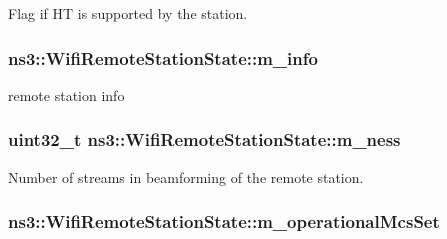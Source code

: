Flag if HT is supported by the station. 

\subsubsection[{\texorpdfstring{m\+\_\+info}{m_info}}]{ ns3\+::\+Wifi\+Remote\+Station\+State\+::m\+\_\+info}\hypertarget{structns3_1_1WifiRemoteStationState_ad094b9d6012f9e03d3b10ff382d5c0eb}{}\label{structns3_1_1WifiRemoteStationState_ad094b9d6012f9e03d3b10ff382d5c0eb}


remote station info 

\subsubsection[{\texorpdfstring{m\+\_\+ness}{m_ness}}]{\setlength{\rightskip}{0pt plus 5cm}uint32\+\_\+t ns3\+::\+Wifi\+Remote\+Station\+State\+::m\+\_\+ness}\hypertarget{structns3_1_1WifiRemoteStationState_a6e8f943986e886b04278448baaa469c6}{}\label{structns3_1_1WifiRemoteStationState_a6e8f943986e886b04278448baaa469c6}


Number of streams in beamforming of the remote station. 

\subsubsection[{\texorpdfstring{m\+\_\+operational\+Mcs\+Set}{m_operationalMcsSet}}]{ ns3\+::\+Wifi\+Remote\+Station\+State\+::m\+\_\+operational\+Mcs\+Set}\hypertarget{structns3_1_1WifiRemoteStationState_a8b765ada4277cdbe684be85ccc974e60}{}\label{structns3_1_1WifiRemoteStationState_a8b765ada4277cdbe684be85ccc974e60}


